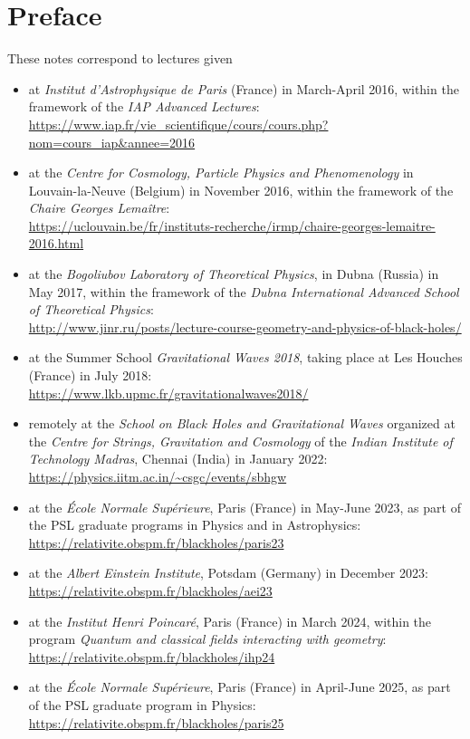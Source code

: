 \chapter*{Preface}

These notes correspond to lectures given
\begin{itemize}
\item at \emph{Institut d'Astrophysique de Paris} (France) in March-April 2016, within the
framework of the \emph{IAP Advanced Lectures}:\\
{\footnotesize\url{https://www.iap.fr/vie_scientifique/cours/cours.php?nom=cours_iap&annee=2016}}
\item at the \emph{Centre for Cosmology, Particle Physics and Phenomenology} in Louvain-la-Neuve
(Belgium) in November 2016, within the framework of the \emph{Chaire Georges Lemaître}:\\
{\footnotesize \url{https://uclouvain.be/fr/instituts-recherche/irmp/chaire-georges-lemaitre-2016.html}}
\item at the
\emph{Bogoliubov Laboratory of Theoretical Physics}, in Dubna (Russia) in May 2017,
within the framework of the \emph{Dubna International Advanced School of Theoretical Physics}:\\
{\footnotesize\url{http://www.jinr.ru/posts/lecture-course-geometry-and-physics-of-black-holes/}}
\item at the Summer School \emph{Gravitational Waves 2018}, taking place at Les Houches
(France) in July 2018:\\
{\footnotesize\url{https://www.lkb.upmc.fr/gravitationalwaves2018/}}
\item remotely at the \emph{School on Black Holes and Gravitational Waves}
organized at the
\emph{Centre for Strings, Gravitation and Cosmology} of the
\emph{Indian Institute of Technology Madras}, Chennai (India) in January 2022:\\
{\footnotesize\url{https://physics.iitm.ac.in/~csgc/events/sbhgw}}
\item at the \emph{École Normale Supérieure}, Paris (France) in May-June 2023, as
part of the PSL graduate programs in Physics and in Astrophysics:\\
{\footnotesize\url{https://relativite.obspm.fr/blackholes/paris23}}
\item at the \emph{Albert Einstein Institute}, Potsdam (Germany) in December 2023:\\
{\footnotesize\url{https://relativite.obspm.fr/blackholes/aei23}}
\item at the \emph{Institut Henri Poincaré}, Paris (France) in March 2024, within the
program \emph{Quantum and classical fields interacting with geometry}:\\
{\footnotesize\url{https://relativite.obspm.fr/blackholes/ihp24}}
\item at the \emph{École Normale Supérieure}, Paris (France) in April-June 2025, as
part of the PSL graduate program in Physics:\\
{\footnotesize\url{https://relativite.obspm.fr/blackholes/paris25}}
\end{itemize}

